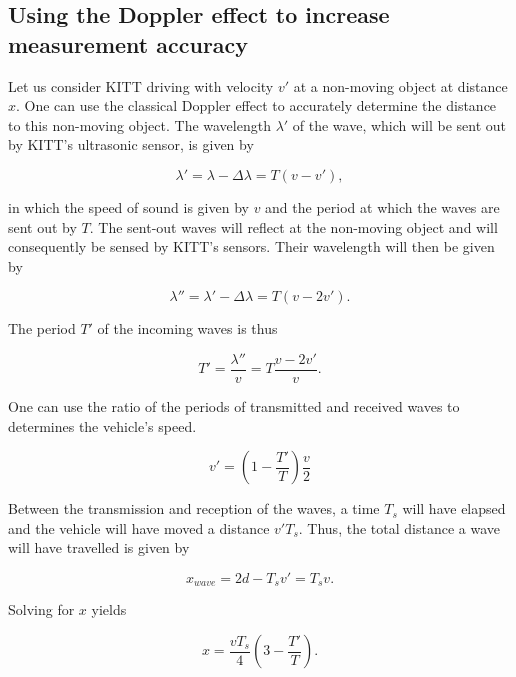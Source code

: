 \documentclass[11pt,titlepage]{report}
\begin{document}
\subsection{Using the Doppler effect to increase measurement accuracy}
Let us consider KITT driving with velocity $v'$ at a non-moving object at distance $x$. One can use the classical Doppler effect to accurately determine the distance to this non-moving object. The wavelength $\lambda'$ of the wave, which will be sent out by KITT's ultrasonic sensor, is given by

\begin{equation}
	\lambda' = \lambda - \Delta \lambda = T (v - v'),
\end{equation}

in which the speed of sound is given by $v$ and the period at which the waves are sent out by $T$. The sent-out waves will reflect at the non-moving object and will consequently be sensed by KITT's sensors. Their wavelength will then be given by

\begin{equation}
	\lambda'' = \lambda' - \Delta \lambda = T (v - 2 v').
\end{equation}

The period $T'$ of the incoming waves is thus

\begin{equation}
	T' = \frac{\lambda''}{v} = T \frac{v - 2 v'}{v}.
\end{equation}

One can use the ratio of the periods of transmitted and received waves to determines the vehicle's speed.

\begin{equation} \label{eq:ass-2-vel-car}
 	v' = \left(1-\frac{T'}{T} \right) \frac{v}{2}
 \end{equation}

Between the transmission and reception of the waves, a time $T_s$ will have elapsed and the vehicle will have moved a distance $v' T_s$. Thus, the total distance a wave will have travelled is given by

\begin{equation}
	x_{wave} = 2 d - T_s v' = T_s v.
\end{equation}

Solving for $x$ yields

\begin{equation} \label{eq:ass-2-pre-dist-car}
	x = \frac{v T_s}{4} \left(3 - \frac{T'}{T} \right).
\end{equation}
\end{document}
